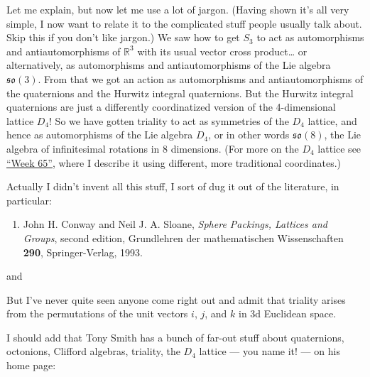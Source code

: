 \documentclass{article}
\def\tightlist{}
\renewcommand{\texttt}[1]{%
  \begingroup
  \ttfamily
  \begingroup\lccode`~=`/\lowercase{\endgroup\def~}{/\discretionary{}{}{}}%
  \begingroup\lccode`~=`[\lowercase{\endgroup\def~}{[\discretionary{}{}{}}%
  \begingroup\lccode`~=`.\lowercase{\endgroup\def~}{.\discretionary{}{}{}}%
  \catcode`/=\active\catcode`[=\active\catcode`.=\active
  \scantokens{#1\noexpand}%
  \endgroup
}
\begin{document}
Let me explain, but now let me use a lot of jargon. (Having shown it's
all very simple, I now want to relate it to the complicated stuff people
usually talk about. Skip this if you don't like jargon.) We saw how to
get \(S_3\) to act as automorphisms and antiautomorphisms of
\(\mathbb{R}^3\) with its usual vector cross product\ldots{} or
alternatively, as automorphisms and antiautomorphisms of the Lie algebra
\(\mathfrak{so}(3)\). From that we got an action as automorphisms and
antiautomorphisms of the quaternions and the Hurwitz integral
quaternions. But the Hurwitz integral quaternions are just a differently
coordinatized version of the 4-dimensional lattice \(D_4\)! So we have
gotten triality to act as symmetries of the \(D_4\) lattice, and hence
as automorphisms of the Lie algebra \(D_4\), or in other words
\(\mathfrak{so}(8)\), the Lie algebra of infinitesimal rotations in 8
dimensions. (For more on the \(D_4\) lattice see
\protect\hyperlink{week65}{``Week 65''}, where I describe it using
different, more traditional coordinates.)

Actually I didn't invent all this stuff, I sort of dug it out of the
literature, in particular:

\begin{enumerate}
\def\labelenumi{\arabic{enumi})}
\tightlist
\item
  John H. Conway and Neil J. A. Sloane, \emph{Sphere Packings, Lattices
  and Groups}, second edition, Grundlehren der mathematischen
  Wissenschaften \textbf{290}, Springer-Verlag, 1993.
\end{enumerate}

and


But I've never quite seen anyone come right out and admit that triality
arises from the permutations of the unit vectors \(i\), \(j\), and \(k\)
in 3d Euclidean space.

I should add that Tony Smith has a bunch of far-out stuff about
quaternions, octonions, Clifford algebras, triality, the \(D_4\) lattice
--- you name it! --- on his home page:
\end{document}
